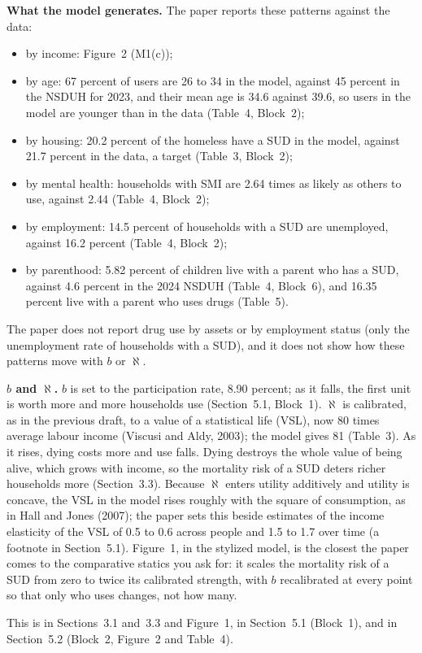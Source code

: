 \documentclass[11pt]{article}
\begin{document}
\begin{response}
\textbf{What the model generates.} The paper reports these patterns against the data:
\begin{itemize}
\item by income: Figure~2 (M1(c));
\item by age: 67 percent of users are 26 to 34 in the model, against 45 percent in
the NSDUH for 2023, and their mean age is 34.6 against 39.6, so users in the model are
younger than in the data (Table~4, Block~2);
\item by housing: 20.2 percent of the homeless have a SUD in the model, against 21.7
percent in the data, a target (Table~3, Block~2);
\item by mental health: households with SMI are 2.64 times as likely as others to use,
against 2.44 (Table~4, Block~2);
\item by employment: 14.5 percent of households with a SUD are unemployed, against
16.2 percent (Table~4, Block~2);
\item by parenthood: 5.82 percent of children live with a parent who has a SUD,
against 4.6 percent in the 2024 NSDUH (Table~4, Block~6), and 16.35 percent live with
a parent who uses drugs (Table~5).
\end{itemize}
\open The paper does not report drug use by assets or by employment status (only the
unemployment rate of households with a SUD), and it does not show how these patterns
move with $b$ or $\aleph$.

\textbf{$b$ and $\aleph$.} $b$ is set to the participation rate, 8.90 percent; as it
falls, the first unit is worth more and more households use (Section~5.1, Block~1).
$\aleph$ is calibrated, as in the previous draft, to a value of a statistical life
(VSL), now 80 times average labour income (Viscusi and Aldy, 2003); the model gives 81
(Table~3). As it rises, dying costs more and use falls. Dying destroys the whole value
of being alive, which grows with income, so the mortality risk of a SUD deters richer
households more (Section~3.3). Because $\aleph$ enters utility additively and utility
is concave, the VSL in the model rises roughly with the square of consumption, as in
Hall and Jones (2007); the paper sets this beside estimates of the income elasticity
of the VSL of 0.5 to 0.6 across people and 1.5 to 1.7 over time (a footnote in
Section~5.1). Figure~1, in the stylized model, is the closest the paper comes to the
comparative statics you ask for: it scales the mortality risk of a SUD from zero to
twice its calibrated strength, with $b$ recalibrated at every point so that only who
uses changes, not how many.

This is in Sections~3.1 and~3.3 and Figure~1, in Section~5.1 (Block~1), and in
Section~5.2 (Block~2, Figure~2 and Table~4).
\end{response}
\end{document}
